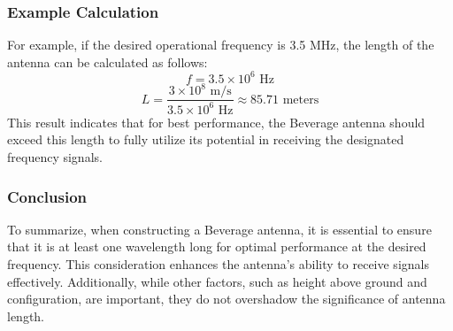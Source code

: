 \subsubsection{Example Calculation}
For example, if the desired operational frequency is 3.5 MHz, the length of the antenna can be calculated as follows:
\[
f = 3.5 \times 10^6 \text{ Hz}
\]
\[
L = \frac{3 \times 10^8 \text{ m/s}}{3.5 \times 10^6 \text{ Hz}} \approx 85.71 \text{ meters}
\]
This result indicates that for best performance, the Beverage antenna should exceed this length to fully utilize its potential in receiving the designated frequency signals.

\subsubsection{Conclusion}
To summarize, when constructing a Beverage antenna, it is essential to ensure that it is at least one wavelength long for optimal performance at the desired frequency. This consideration enhances the antenna's ability to receive signals effectively. Additionally, while other factors, such as height above ground and configuration, are important, they do not overshadow the significance of antenna length.

